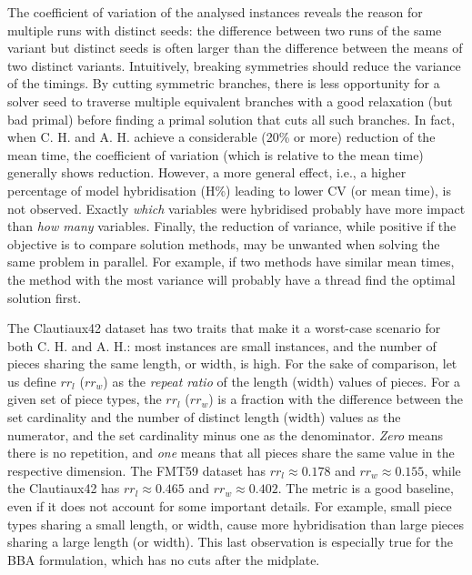 \documentclass[ppgc,tese,english,formais,babel]{iiufrgs}
\begin{document}
The coefficient of variation of the analysed instances reveals the reason for multiple runs with distinct seeds: the difference between two runs of the same variant but distinct seeds is often larger than the difference between the means of two distinct variants.
Intuitively, breaking symmetries should reduce the variance of the timings.
By cutting symmetric branches, there is less opportunity for a solver seed to traverse multiple equivalent branches with a good relaxation (but bad primal) before finding a primal solution that cuts all such branches.
In fact, when C. H. and A. H. achieve a considerable (20\% or more) reduction of the mean time, the coefficient of variation (which is relative to the mean time) generally shows reduction.
However, a more general effect, i.e., a higher percentage of model hybridisation (H\%) leading to lower CV (or mean time), is not observed.
Exactly \emph{which} variables were hybridised probably have more impact than \emph{how many} variables.
Finally, the reduction of variance, while positive if the objective is to compare solution methods, may be unwanted when solving the same problem in parallel.
For example, if two methods have similar mean times, the method with the most variance will probably have a thread find the optimal solution first.

The Clautiaux42 dataset has two traits that make it a worst-case scenario for both C. H. and A. H.: most instances are small instances, and the number of pieces sharing the same length, or width, is high.
For the sake of comparison, let us define \(rr_l\) (\(rr_w\)) as the \emph{repeat ratio} of the length (width) values of pieces.
For a given set of piece types, the \(rr_l\) (\(rr_w\)) is a fraction with the difference between the set cardinality and the number of distinct length (width) values as the numerator, and the set cardinality minus one as the denominator.
\emph{Zero} means there is no repetition, and \emph{one} means that all pieces share the same value in the respective dimension.
The FMT59 dataset has \(rr_l \approx 0.178\) and \(rr_w \approx 0.155\), while the Clautiaux42 has \(rr_l \approx 0.465\) and \(rr_w \approx 0.402\).
The metric is a good baseline, even if it does not account for some important details.
For example, small piece types sharing a small length, or width, cause more hybridisation than large pieces sharing a large length (or width).
This last observation is especially true for the BBA formulation, which has no cuts after the midplate.
\end{document}
